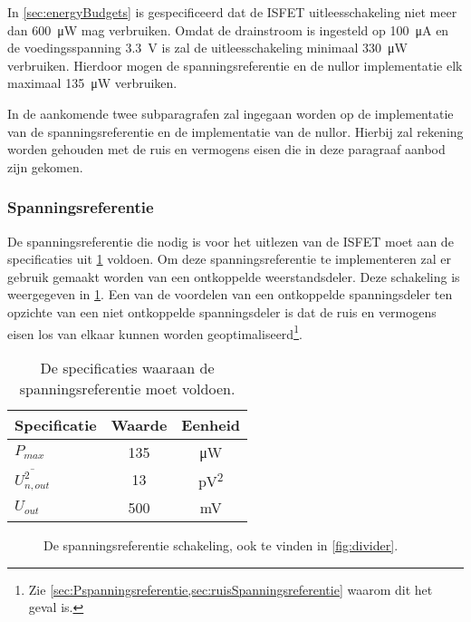 In \cref{sec:energyBudgets} is gespecificeerd dat de ISFET uitleesschakeling niet meer dan \qty{600}{\micro\watt} mag verbruiken. Omdat de drainstroom is ingesteld op \qty{100}{\micro\ampere} en de voedingsspanning \qty{3.3}{\volt} is zal de uitleesschakeling minimaal \qty{330}{\micro\watt} verbruiken. Hierdoor mogen de spanningsreferentie en de nullor implementatie elk maximaal \qty{135}{\micro\watt} verbruiken.

In de aankomende twee subparagrafen zal ingegaan worden op de implementatie van de spanningsreferentie en de implementatie van de nullor. Hierbij zal rekening worden gehouden met de ruis en vermogens eisen die in deze paragraaf aanbod zijn gekomen.

\subsubsection{Spanningsreferentie}
De spanningsreferentie die nodig is voor het uitlezen van de ISFET moet aan de specificaties uit \cref{tab:specsSpanningsreferentie} voldoen. Om deze spanningsreferentie te implementeren zal er gebruik gemaakt worden van een ontkoppelde weerstandsdeler. Deze schakeling is weergegeven in \cref{fig:dividerForContext}. Een van de voordelen van een ontkoppelde spanningsdeler ten opzichte van een niet ontkoppelde spanningsdeler is dat de ruis en vermogens eisen los van elkaar kunnen worden geoptimaliseerd\footnote{Zie \cref{sec:Pspanningsreferentie,sec:ruisSpanningsreferentie} waarom dit het geval is.}.
\begin{table}[!htb]
    \centering
    \begin{tabular}{l|c|c}
        Specificatie & Waarde & Eenheid  \\\hline
        $P_{max}$ & 135 & \si{\micro\watt}\\
        $\overline{U_{n,out}^2}$ & 13 & \si{\pico\volt^2}\\
        $U_{out}$ & 500 & \si{\milli\volt}\\
    \end{tabular}
    \caption{De specificaties waaraan de spanningsreferentie moet voldoen.}
    \label{tab:specsSpanningsreferentie}
\end{table}
\begin{figure}[!htb]
    \centering
    \def\svgwidth{7cm}
    
    \caption{De spanningsreferentie schakeling, ook te vinden in \cref{fig:divider}.}
    \label{fig:dividerForContext}
\end{figure}

